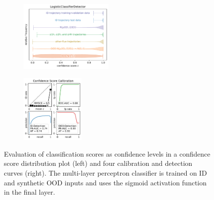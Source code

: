 \begin{figure}[H]
    \centering
    \begin{subfigure}
        \centering
        \includegraphics[width=0.505\textwidth,valign=t]{ood-detection/figures/confidence-score/ood.logisticclassifierdetector-distribution.pdf}
    \end{subfigure}
    \begin{subfigure}
        \centering
        \includegraphics[width=0.345\textwidth,valign=t]{ood-detection/figures/confidence-score/ood.logisticclassifierdetector-calibration.pdf}
    \end{subfigure}

    \caption[Evaluation of Classification Scores as Confidence Levels]{Evaluation of classification scores as confidence levels in a confidence score distribution plot (left) and four calibration and detection curves (right). The multi-layer perceptron classifier is trained on ID and synthetic OOD inputs and uses the sigmoid activation function in the final layer.}
    \label{fig:classifier-ood-scoring}
\end{figure}

